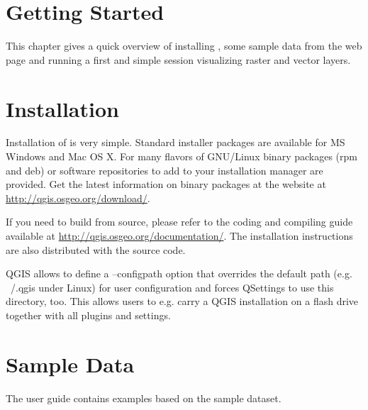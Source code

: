 
\section{Getting Started}\label{label_getstarted}

\updatedisclaimer

This chapter gives a quick overview of installing \qg, some sample 
data from the \qg web page and running a first and simple session 
visualizing raster and vector layers.

\section{Installation}\label{label_installation}

Installation of \qg is very simple. Standard installer packages are
available for MS Windows and Mac OS X. For many flavors of GNU/Linux binary
packages (rpm and deb) or software repositories to add to your installation
manager are provided. Get the latest information on binary packages at the
\qg website at \url{http://qgis.osgeo.org/download/}.


If you need to build \qg from source, please refer to the coding and
compiling guide available at \url{http://qgis.osgeo.org/documentation/}. 
The installation instructions are also distributed with the \qg source
code.


QGIS allows to define a --configpath option that overrides the default path 
(e.g. ~/.qgis under Linux) for user configuration and forces QSettings to use 
this directory, too. This allows users to e.g. carry a QGIS installation on a 
flash drive together with all plugins and settings. 

\section{Sample Data}\label{label_sampledata}

The user guide contains examples based on the \qg sample dataset. 

